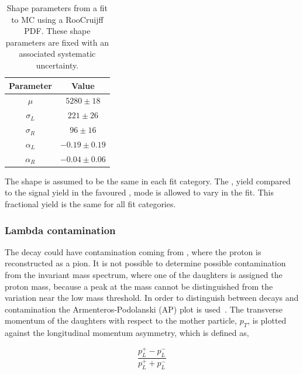 \begin{table}[h]
\centering
\begin{tabular}{cc}
\hline
Parameter & Value \\
\hline
$\mu$ & $5280 \pm 18$ \\
$\sigma_L$ & $221 \pm 26$ \\
$\sigma_R$ & $96 \pm 16$ \\
$\alpha_L$ & $-0.19 \pm 0.19$ \\
$\alpha_R$ & $-0.04 \pm 0.06$ \\
\hline
\end{tabular}
\caption{Shape parameters from a fit to \decay{\Lb}{\Lc\kaon} MC using a RooCruijff PDF. These shape parameters are fixed with an associated systematic uncertainty.}
\label{fitresultsLb}
\end{table}

The shape is assumed to be the same in each \decay{\D}{\Kp\Km} fit category. The \decay{\Lb}{\Lc\Kstar},  yield compared to the signal yield in the favoured \decay{\Bm}{\D\Kstarm}, \decay{\D}{\Kp\Km} mode is allowed to vary in the fit. This fractional yield is the same for all fit categories. 

\subsubsection{Lambda contamination}
\label{sec:backgrounds:contamination}

The \decay{\KS}{\pip\pim} decay could have contamination coming from \decay{\Lz}{\proton\pim}, where the proton is reconstructed as a pion. It is not possible to determine possible \Lz contamination from the \KS invariant mass spectrum, where one of the \KS daughters is assigned the proton mass, because a peak at the \Lz mass cannot be distinguished from the variation near the low mass threshold. In order to distinguish between \KS decays and \Lz contamination the Armenteros-Podolanski (AP) plot is used~\cite{APplot}. The transverse momentum of the daughters with respect to the mother particle, $p_T$, is plotted against the longitudinal momentum asymmetry, which is defined as,

\begin{equation}
\frac{p_L^+ - p_L^-}{p_L^+ + p_L^-}
\end{equation}

